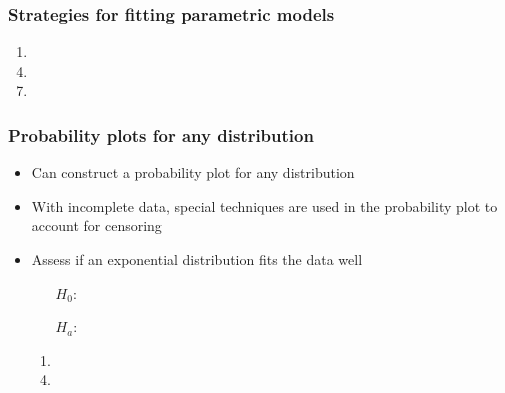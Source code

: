 \begin{frame}
\frametitle{Strategies for fitting parametric models}
\begin{enumerate}
\item  %
\item[]
\item[]
\item %
\item[] %
\item[] %
\item %
\item[] %
\item[] %
\end{enumerate}
\end{frame}



\begin{frame}
\frametitle{Probability plots for any distribution}
\begin{itemize}
\item Can construct a probability plot for any distribution
\item With incomplete data, special techniques are used in the probability plot to account for censoring
\item Assess if an exponential distribution fits the data well
\item[]
\begin{itemize}
\item[$H_0$:]
\item[]
\item[$H_a$:]
\item[]
\end{itemize}
\item[]
\begin{enumerate}
\item %
\item[]
\item[]
\item %
\item[] %
\item[] %
\end{enumerate}
\end{itemize}
\end{frame}

